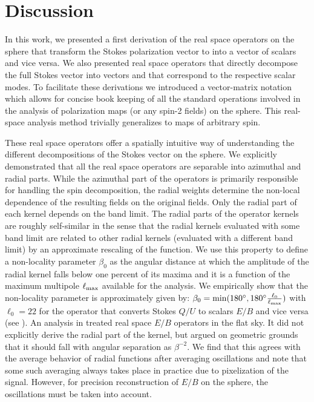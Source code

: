 \section{Discussion}\label{sec:discussion}
In this work, we presented a first derivation of the real space operators on the sphere that transform the Stokes polarization vector to into a vector of scalars and vice versa.  We also presented real space operators that directly decompose the full Stokes vector \vp{} into vectors  and  that correspond to the respective scalar modes.  To facilitate these derivations we introduced a vector-matrix notation which allows for concise book keeping of all the standard operations involved in the analysis of  polarization maps (or any spin-2 fields) on the sphere. This real-space analysis method trivially generalizes to maps of arbitrary spin.

These real space operators offer a spatially intuitive way of understanding the different decompositions of the Stokes vector on the sphere. We explicitly  demonstrated that all the real space operators are separable into azimuthal and radial parts. While the azimuthal part of the operators is primarily responsible for handling the spin decomposition, the radial weights determine the non-local dependence of the resulting fields on the original fields.  Only the radial part of each kernel depends on the band limit. 
The radial parts of the operator kernels are roughly self-similar in the sense that the radial kernels evaluated with some band limit are related to other radial kernels (evaluated with a different band limit) by an approximate rescaling of the function. We use this property to define a non-locality parameter $\beta_0$ as the angular distance at which the amplitude of the radial kernel falls below one percent of its maxima and it  is a function of the maximum multipole $\ell_{\rm max}$ available for the analysis. We empirically show that the non-locality parameter is approximately given by: $\beta_0 = \mathrm{min}(180^{\circ}, 180^{\circ} \frac{\ell_{0}}{\ell_{\rm max}})$ with $\ell_{0}=22$ for the operator that converts Stokes $Q/U$ to scalars $E/B$ and vice versa (see ). An analysis in  \cite{Zaldarriaga2001a} treated real space $E/B$ operators in the flat sky.  It did not explicitly derive the radial part of the kernel, but argued on geometric grounds that it should fall with angular separation as $\beta^{-2}$.  We find that this agrees with the average behavior of radial functions after averaging oscillations and note that some such averaging always takes place in practice due to pixelization of the signal.  However, for precision reconstruction of $E/B$ on the sphere, the oscillations must be taken into account.

